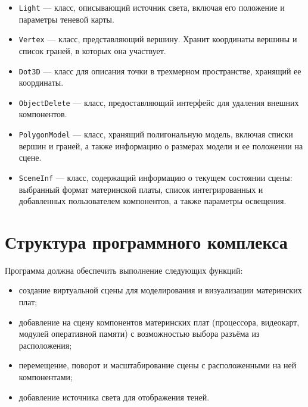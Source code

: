 \begin{itemize}[label=---]
	\item \texttt{Light} — класс, описывающий источник света, включая его положение и параметры теневой карты.
	
	\item \texttt{Vertex} — класс, представляющий вершину. Хранит координаты вершины и список граней, в которых она участвует.
	
	\item \texttt{Dot3D} — класс для описания точки в трехмерном пространстве, хранящий ее координаты.
	
	\item \texttt{ObjectDelete} — класс, предоставляющий интерфейс для удаления внешних компонентов.
	
	\item \texttt{PolygonModel} — класс, хранящий полигональную модель, включая списки вершин и граней, а также информацию о размерах модели и ее положении на сцене.
	
	\item \texttt{SceneInf} — класс, содержащий информацию о текущем состоянии сцены: выбранный формат материнской платы, список интегрированных и добавленных пользователем компонентов, а также параметры освещения.
\end{itemize}


\section{Структура программного комплекса}

Программа должна обеспечить выполнение следующих функций:
\begin{itemize}[label=---]
	\item создание виртуальной сцены для моделирования и визуализации материнских плат;
	\item добавление на сцену компонентов материнских плат (процессора, видеокарт, модулей оперативной памяти) с возможностью выбора разъёма из расположения;
	\item перемещение, поворот и масштабирование сцены с расположенными на ней компонентами;
	\item добавление источника света для отображения теней.
\end{itemize}

